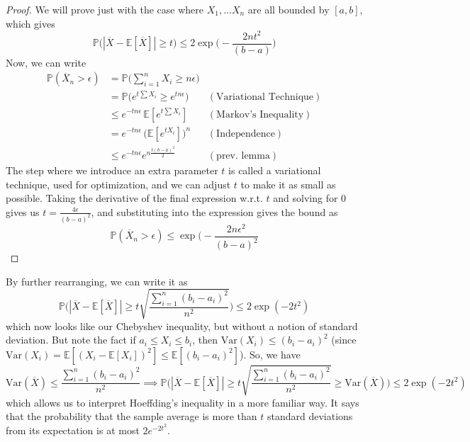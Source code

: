     \begin{proof}
      We will prove just with the case where $X_1, \ldots X_n$ are all bounded by $[a, b]$, which gives 
      \[\mathbb{P} \big( |\overline{X} - \mathbb{E}[\overline{X}] | \geq t \big) \leq 2 \exp \bigg( - \frac{2 n t^2}{(b - a)}\bigg)\] 
      Now, we can write 
      \begin{align*}
        \mathbb{P}(\overline{X}_n > \epsilon ) & = \mathbb{P} \Big( \sum_{i=1}^n X_i \geq n \epsilon \Big) \\
        & = \mathbb{P} \big( e^{t \sum X_i} \geq e^{t n \epsilon} \big) & (\text{Variational Technique}) \\
        & \leq e^{- t n \epsilon} \, \mathbb{E}[e^{t \sum X_i}] & (\text{Markov's Inequality}) \\
        & = e^{-t n \epsilon} \, \big( \mathbb{E}[ e^{t X_i}] \big)^n & (\text{Independence}) \\
        & \leq e^{-t n \epsilon} e^{n \frac{t (b - a)^2}{2}} & (\text{prev. lemma}) 
      \end{align*}
      The step where we introduce an extra parameter $t$ is called a variational technique, used for optimization, and we can adjust $t$ to make it as small as possible. Taking the derivative of the final expression w.r.t. $t$ and solving for $0$ gives us $t = \frac{4 \epsilon}{(b - a)^2}$, and substituting into the expression gives the bound as 
      \begin{equation}
        \mathbb{P}(\overline{X}_n > \epsilon ) \leq \exp \bigg(- \frac{2 n \epsilon^2}{(b - a)^2}
      \end{equation}
    \end{proof}

    By further rearranging, we can write it as 
    \begin{equation}
      \mathbb{P} \bigg( | \overline{X} - \mathbb{E}[\overline{X}] | \geq t \sqrt{\frac{\sum_{i=1}^n (b_i - a_i)^2}{n^2}} \bigg) \leq 2 \exp(-2t^2)
    \end{equation}
    which now looks like our Chebyshev inequality, but without a notion of standard deviation. But note the fact if $a_i \leq X_i \leq b_i$, then $\mathrm{Var}(X_i) \leq (b_i - a_i)^2$ (since $\mathrm{Var}(X_i) = \mathbb{E}[(X_i - \mathbb{E}[X_i])^2] \leq \mathbb{E}[(b_i - a_i)^2]$). So, we have 
    \begin{equation}
      \mathrm{Var}(\overline{X}) \leq \frac{\sum_{i=1}^n (b_i - a_i)^2}{n^2} \implies \mathbb{P}\bigg( |\overline{X} - \mathbb{E}[\overline{X}] | \geq t \sqrt{\frac{\sum_{i=1}^n (b_i - a_i)^2}{n^2}} \geq \mathrm{Var}(\overline{X}) \bigg) \leq 2\exp(-2t^2)
    \end{equation}
    which allows us to interpret Hoeffding's inequality in a more familiar way. It says that the probability that the sample average is more than $t$ standard deviations from its expectation is at most $2 e^{-2t^2}$. 

